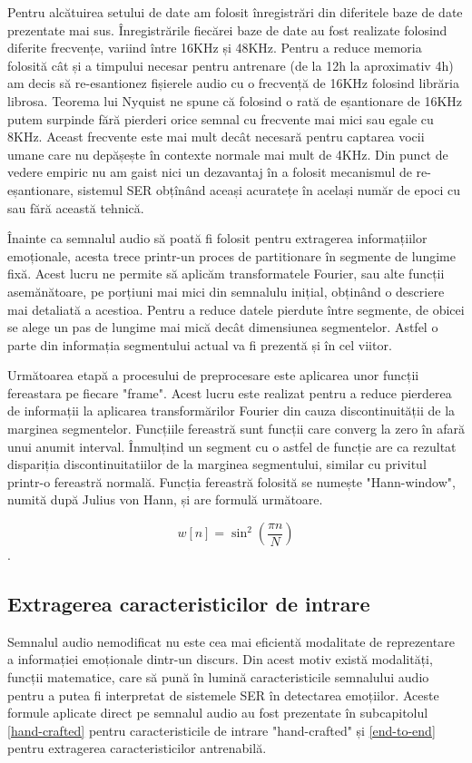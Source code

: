 \documentclass[a4paper,12pt]{book}
\begin{document}
					Pentru alcătuirea setului de date am folosit înregistrări din diferitele baze de date prezentate mai sus. Înregistrările fiecărei baze de date au fost realizate folosind diferite frecvențe, variind între 16KHz și 48KHz. Pentru a reduce memoria folosită cât și a  timpului necesar pentru antrenare (de la 12h la aproximativ 4h) am decis să re-esantionez fișierele audio cu o frecvență de 16KHz folosind librăria librosa. Teorema lui Nyquist ne spune că folosind o rată de eșantionare de 16KHz putem surpinde fără pierderi orice semnal cu frecvente mai mici sau egale cu 8KHz. Aceast frecvente este mai mult decât necesară pentru captarea vocii umane care nu depășește în contexte normale mai mult de 4KHz. Din punct de vedere empiric nu am gaist nici un dezavantaj în a folosit mecanismul de re-eșantionare, sistemul SER obțînând aceași acuratețe în același număr de epoci cu sau fără această tehnică. \par
					
					Înainte ca semnalul audio să poată fi folosit pentru extragerea informațiilor emoționale, acesta trece printr-un proces de partitionare în segmente de lungime fixă. Acest lucru ne permite să aplicăm transformatele Fourier, sau alte funcții asemănătoare, pe porțiuni mai mici din semnalulu inițial, obținând o descriere mai detaliată a acestioa. Pentru a reduce datele pierdute între segmente, de obicei se alege un pas de lungime mai mică decât dimensiunea segmentelor. Astfel o parte din informația segmentului actual va fi prezentă și în cel viitor. \par 
					Următoarea etapă a procesului de preprocesare este aplicarea unor funcții fereastara pe fiecare "frame". Acest lucru este realizat pentru a reduce pierderea de informații la aplicarea transformărilor Fourier din cauza discontinuității de la marginea segmentelor. Funcțiile fereastră sunt funcții care converg la zero în afară unui anumit interval. Înmulțind un segment cu o astfel de funcție are ca rezultat dispariția discontinuitatiilor de la marginea segmentului, similar cu privitul printr-o fereastră normală. Funcția fereastră folosită se numește "Hann-window", numită după Julius von Hann, și are formulă următoare. \par
					\begin{equation}
					w[n]=\sin^2(\frac{\pi n}{N})
					\end{equation}.
					
				\subsection{Extragerea caracteristicilor de intrare} \label{fex}
				Semnalul audio nemodificat nu este cea mai eficientă modalitate de reprezentare a informației emoționale dintr-un discurs. Din acest motiv există modalități, funcții matematice, care să pună în lumină caracteristicile semnalului audio pentru a putea fi interpretat de sistemele SER în detectarea emoțiilor. Aceste formule aplicate direct pe semnalul audio au fost prezentate în subcapitolul \ref{hand-crafted} pentru caracteristicile de intrare "hand-crafted" și \ref{end-to-end} pentru extragerea caracteristicilor antrenabilă. \par
				
\end{document}
